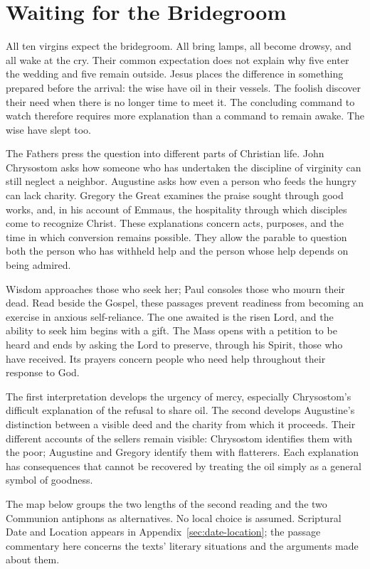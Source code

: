 \section{Waiting for the Bridegroom}
All ten virgins expect the bridegroom. All bring lamps, all become drowsy, and all wake at the cry. Their common expectation does not explain why five enter the wedding and five remain outside. Jesus places the difference in something prepared before the arrival: the wise have oil in their vessels. The foolish discover their need when there is no longer time to meet it. The concluding command to watch therefore requires more explanation than a command to remain awake. The wise have slept too.

The Fathers press the question into different parts of Christian life. John Chrysostom asks how someone who has undertaken the discipline of virginity can still neglect a neighbor. Augustine asks how even a person who feeds the hungry can lack charity. Gregory the Great examines the praise sought through good works, and, in his account of Emmaus, the hospitality through which disciples come to recognize Christ. These explanations concern acts, purposes, and the time in which conversion remains possible. They allow the parable to question both the person who has withheld help and the person whose help depends on being admired.

Wisdom approaches those who seek her; Paul consoles those who mourn their dead. Read beside the Gospel, these passages prevent readiness from becoming an exercise in anxious self-reliance. The one awaited is the risen Lord, and the ability to seek him begins with a gift. The Mass opens with a petition to be heard and ends by asking the Lord to preserve, through his Spirit, those who have received. Its prayers concern people who need help throughout their response to God.

The first interpretation develops the urgency of mercy, especially Chrysostom's difficult explanation of the refusal to share oil. The second develops Augustine's distinction between a visible deed and the charity from which it proceeds. Their different accounts of the sellers remain visible: Chrysostom identifies them with the poor; Augustine and Gregory identify them with flatterers. Each explanation has consequences that cannot be recovered by treating the oil simply as a general symbol of goodness.

The map below groups the two lengths of the second reading and the two Communion antiphons as alternatives. No local choice is assumed. Scriptural Date and Location appears in Appendix~\ref{sec:date-location}; the passage commentary here concerns the texts' literary situations and the arguments made about them.
